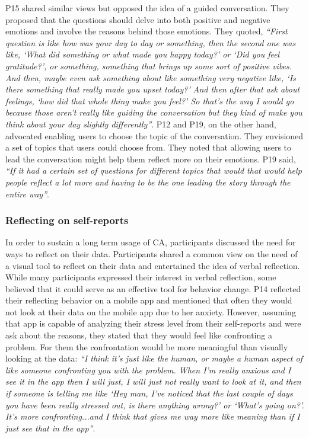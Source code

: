         
                P15 shared similar views but opposed the idea of a guided conversation. They proposed that the questions should delve into both positive and negative emotions and involve the reasons behind those emotions. They quoted,
                    \textit{``First question is like how was your day to day or something, then the second one was like, `What did something or what made you happy today?' or `Did you feel gratitude?', or something, something that brings up some sort of positive vibes. And then, maybe even ask something about like something very negative like, `Is there something that really made you upset today?' And then after that ask about feelings, `how did that whole thing make you feel?' So that's the way I would go because those aren't really like guiding the conversation but they kind of make you think about your day slightly differently''}.
                P12 and P19, on the other hand, advocated enabling users to choose the topic of the conversation. They envisioned a set of topics that users could choose from. They noted that allowing users to lead the conversation might help them reflect more on their emotions. P19 said,
                    \textit{``If it had a certain set of questions for different topics that would that would help people reflect a lot more and having to be the one leading the story through the entire way''}.
        
    
        \subsubsection{Reflecting on self-reports}
            In order to sustain a long term usage of \ac{CA}, participants discussed the need for ways to reflect on their data. Participants shared a common view on the need of a visual tool to reflect on their data and entertained the idea of verbal reflection. While many participants expressed their interest in verbal reflection, some believed that it could serve as an effective tool for behavior change.
            P14 reflected their reflecting behavior on a mobile app and mentioned that often they would not look at their data on the mobile app due to her anxiety. However, assuming that \acl{app} is capable of analyzing their stress level from their self-reports and were ask about the reasons, they stated that they would feel like confronting a problem. For them the confrontation would be more meaningful than visually looking at the data:
                \textit{``I think it's just like the human, or maybe a human aspect of like someone confronting you with the problem. When I'm really anxious and I see it in the app then I will just, I will just not really want to look at it, and then if someone is telling me like `Hey man, I've noticed that the last couple of days you have been really stressed out, is there anything wrong?' or `What's going on?'. It's more confronting...and I think that gives me way more like meaning than if I just see that in the app''}.
                
